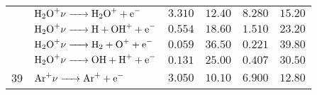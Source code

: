 \documentclass[a4paper, 10pt]{article}
\begin{document}
\begin{table}
\begin{tabularx}{0.99\textwidth}{lX rrrr}
		 & $\ce{H2O+$\nu$ -> H2O+ + e-}$ & $\num{3.310}$ & $\num{12.40}$ & $\num{8.280}$ & $\num{15.20}$ \\
		 & $\ce{H2O+$\nu$ -> H + OH+ + e-}$ & $\num{0.554}$ & $\num{18.60}$ & $\num{1.510}$ & $\num{23.20}$ \\
		 & $\ce{H2O+$\nu$ -> H2 + O+ + e-}$ & $\num{0.059}$ & $\num{36.50}$ & $\num{0.221}$ & $\num{39.80}$ \\
		 & $\ce{H2O+$\nu$ -> OH + H+ + e-}$ & $\num{0.131}$ & $\num{25.00}$ & $\num{0.407}$ & $\num{30.50}$ \\
		\midrule
		39 & $\ce{Ar+$\nu$ -> Ar+ + e-}$ & $\num{3.050}$ & $\num{10.10}$ & $\num{6.900}$ & $\num{12.80}$ \\
		\bottomrule
	\end{tabularx}
	\label{tab:photorates_HUEBNER1992}
\end{table}
\end{document}
